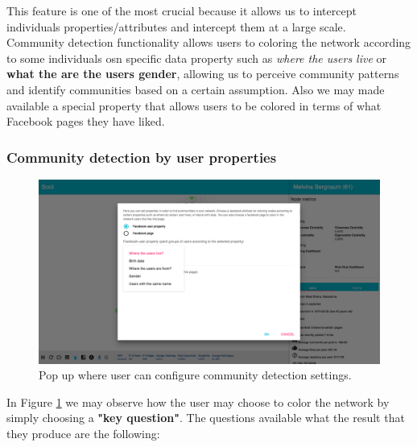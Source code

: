 This feature is one of the most crucial because it allows us to intercept individuals properties/attributes and intercept them at a large scale.\\
\indent Community detection functionality allows users to coloring the network according to some individuals \gls{osn} specific data property such as \textit{where the users live} or \textbf{what the are the users gender}, allowing us to perceive community patterns and identify communities based on a certain assumption. Also we may made available a special property that allows users to be colored in terms of what Facebook pages they have liked.

\subsubsection*{Community detection by user properties}

\begin{figure}[h!]
\begin{center}
  \hspace*{-0.8in}
  \includegraphics[width=1.2\textwidth]{img/socii/socii_8.png}
\end{center}
\caption{\label{img:socii_8} Pop up where user can configure community detection settings.}
\end{figure}

In Figure \ref{img:socii_8} we may observe how the user may choose to color the network by simply choosing a \textbf{"key question"}. The questions available what the result that they produce are the following:

